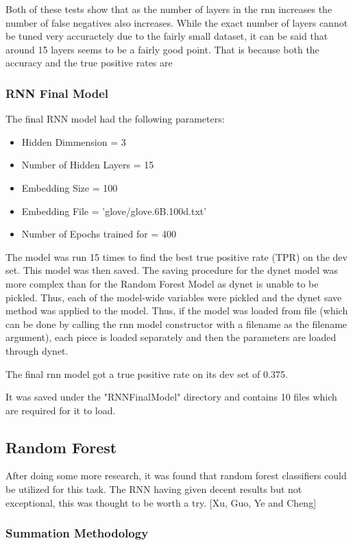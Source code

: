 \documentclass[twoside,twocolumn]{article}
\begin{document}
Both of these tests show that as the number of layers in the rnn increases the number of false
negatives also increases. While the exact number of layers cannot be tuned very accuractely
due to the fairly small dataset, it can be said that around 15 layers seems to be a fairly good point. 
That is because both the accuracy and the true positive rates are 


\subsubsection{RNN Final Model}

The final RNN model had the following parameters:
\begin{itemize}
\item Hidden Dimmension = 3
\item Number of Hidden Layers = 15
\item Embedding Size = 100
\item Embedding File = 'glove/glove.6B.100d.txt'
\item Number of Epochs trained for = 400 
\end{itemize}

The model was run 15 times to find the best true positive rate (TPR) on the dev set.
This model was then saved. The saving procedure for the dynet model was more complex than
for the Random Forest Model as dynet is unable to be pickled. Thus, each of the model-wide
variables were pickled and the dynet save method was applied to the model. Thus, if the model
was loaded from file (which can be done by calling the rnn model constructor with a filename
as the filename argument), each piece is loaded separately and then the parameters are loaded
through dynet.

The final rnn model got a true positive rate on its dev set of 0.375.

It was saved under the "RNNFinalModel" directory and contains 10 files which are required for it
to load.


\subsection{Random Forest}

After doing some more research, it was found that random forest classifiers could
be utilized for this task. The RNN having given decent results but not exceptional,
this was thought to be worth a try. [Xu, Guo, Ye and Cheng]

\subsubsection{Summation Methodology}
\end{document}
